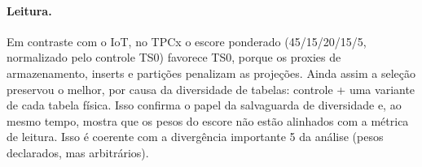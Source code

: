 \paragraph{Leitura.} Em contraste com o IoT, no TPCx o escore ponderado (45/15/20/15/5, normalizado pelo controle TS0) favorece TS0, porque os proxies de armazenamento, inserts e partições penalizam as projeções. Ainda assim a seleção preservou o melhor, por causa da diversidade de tabelas: controle + uma variante de cada tabela física. Isso confirma o papel da salvaguarda de diversidade e, ao mesmo tempo, mostra que os pesos do escore não estão alinhados com a métrica de leitura. Isso é coerente com a divergência importante 5 da análise (pesos declarados, mas arbitrários).
